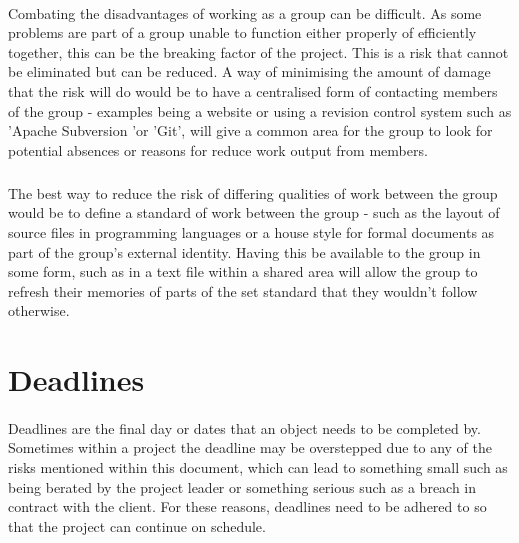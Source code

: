 \documentclass{article}
\begin{document}
\pagebreak

\begin{comment}
Page formatting makes the file look more professional with a page break above.
May be subject to change when this file is absorbed into the amalgamated file.
\end{comment}

\paragraph{}
Combating the disadvantages of working as a group can be difficult.  As some
problems are part of a group unable to function either properly of efficiently
together, this can be the breaking factor of the project.  This is a risk that
cannot be eliminated but can be reduced.  A way of minimising the amount of
damage that the risk will do would be to have a centralised form of contacting
members of the group - examples being a website or using a revision control
system such as 'Apache Subversion 'or 'Git', will give a common area for the
group to look for potential absences or reasons for reduce work output from
members. 

\subparagraph{}

The best way to reduce the risk of differing qualities of work between the group
would be to define a standard of work between the group - such as the layout of
source files in programming languages or a house style for formal documents as
part of the group's external identity.  Having this be available to the group in
some form, such as in a text file within a shared area will allow the group to
refresh their memories of parts of the set standard that they wouldn't follow
otherwise.

\section{Deadlines}
\paragraph{}

Deadlines are the final day or dates that an object needs to be completed by.
Sometimes within a project the deadline may be overstepped due to any of the
risks mentioned within this document, which can lead to something small such as
being berated by the project leader or something serious such as a breach in
contract with the client.  For these reasons, deadlines need to be adhered to
so that the project can continue on schedule.
\end{document}
